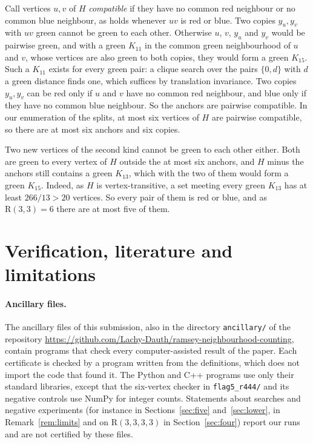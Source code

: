 \documentclass[11pt]{article}
\theoremstyle{spacedplain}
\theoremstyle{spaceddef}
\theoremstyle{spacedremark}
\newcommand{\R}{\mathrm{R}}
\begin{document}
Call vertices $u,v$ of $H$ \emph{compatible} if they have no common red neighbour or no common blue neighbour, as holds whenever $uv$ is red or blue.
Two copies $y_u,y_v$ with $uv$ green cannot be green to each other.
Otherwise $u$, $v$, $y_u$ and $y_v$ would be pairwise green, and with a green $K_{11}$ in the common green neighbourhood of $u$ and $v$, whose vertices are also green to both copies, they would form a green $K_{15}$.
Such a $K_{11}$ exists for every green pair: a clique search over the pairs $\{0,d\}$ with $d$ a green distance finds one, which suffices by translation invariance.
Two copies $y_u,y_v$ can be red only if $u$ and $v$ have no common red neighbour, and blue only if they have no common blue neighbour.
So the anchors are pairwise compatible.
In our enumeration of the splits, at most six vertices of $H$ are pairwise compatible, so there are at most six anchors and six copies.

Two new vertices of the second kind cannot be green to each other either.
Both are green to every vertex of $H$ outside the at most six anchors, and $H$ minus the anchors still contains a green $K_{13}$, which with the two of them would form a green $K_{15}$.
Indeed, as $H$ is vertex-transitive, a set meeting every green $K_{13}$ has at least $266/13>20$ vertices.
So every pair of them is red or blue, and as $\R(3,3)=6$ there are at most five of them.

\section{Verification, literature and limitations}\label{sec:verify}

\paragraph{Ancillary files.}
The ancillary files of this submission, also in the directory \texttt{ancillary/} of the repository \url{https://github.com/Lachy-Dauth/ramsey-neighbourhood-counting}, contain programs that check every computer-assisted result of the paper.
Each certificate is checked by a program written from the definitions, which does not import the code that found it.
The Python and C++ programs use only their standard libraries, except that the six-vertex checker in \texttt{flag5\_r444/} and its negative controls use NumPy for integer counts.
Statements about searches and negative experiments (for instance in Sections~\ref{sec:five} and~\ref{sec:lower}, in Remark~\ref{rem:limits} and on $\R(3,3,3,3)$ in Section~\ref{sec:four}) report our runs and are not certified by these files.
\end{document}
